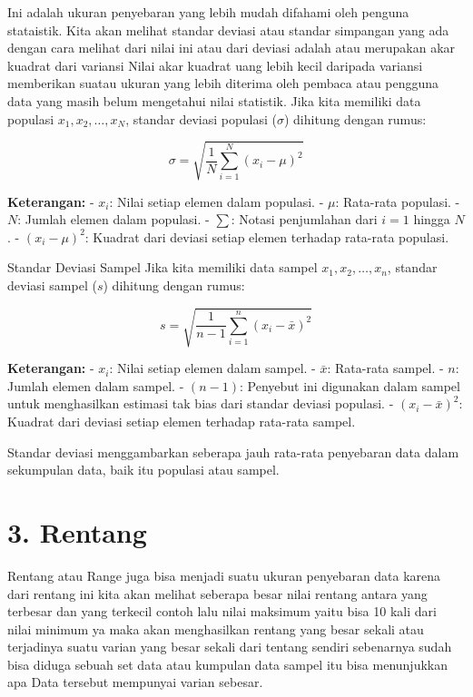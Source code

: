 \documentclass[
]{book}
\theoremstyle{definition}
\theoremstyle{definition}
\theoremstyle{definition}
\theoremstyle{definition}
\theoremstyle{remark}
\begin{document}
Ini adalah ukuran penyebaran yang lebih mudah difahami oleh penguna stataistik. Kita akan melihat standar deviasi atau standar simpangan yang ada dengan cara melihat dari nilai ini atau dari deviasi adalah atau merupakan akar kuadrat dari variansi
Nilai akar kuadrat uang lebih kecil daripada variansi memberikan suatau ukuran yang lebih diterima oleh pembaca atau pengguna data yang masih belum mengetahui nilai statistik.
Jika kita memiliki data populasi \(x_1, x_2, \dots, x_N\), standar deviasi populasi (\(\sigma\)) dihitung dengan rumus:

\[
\sigma = \sqrt{\frac{1}{N} \sum_{i=1}^{N} (x_i - \mu)^2}
\]

\textbf{Keterangan:}
- \(x_i\): Nilai setiap elemen dalam populasi.
- \(\mu\): Rata-rata populasi.
- \(N\): Jumlah elemen dalam populasi.
- \(\sum\): Notasi penjumlahan dari \(i = 1\) hingga \(N\).
- \((x_i - \mu)^2\): Kuadrat dari deviasi setiap elemen terhadap rata-rata populasi.

Standar Deviasi Sampel
Jika kita memiliki data sampel \(x_1, x_2, \dots, x_n\), standar deviasi sampel (\(s\)) dihitung dengan rumus:

\[
s = \sqrt{\frac{1}{n - 1} \sum_{i=1}^{n} (x_i - \bar{x})^2}
\]

\textbf{Keterangan:}
- \(x_i\): Nilai setiap elemen dalam sampel.
- \(\bar{x}\): Rata-rata sampel.
- \(n\): Jumlah elemen dalam sampel.
- \((n - 1)\): Penyebut ini digunakan dalam sampel untuk menghasilkan estimasi tak bias dari standar deviasi populasi.
- \((x_i - \bar{x})^2\): Kuadrat dari deviasi setiap elemen terhadap rata-rata sampel.

Standar deviasi menggambarkan seberapa jauh rata-rata penyebaran data dalam sekumpulan data, baik itu populasi atau sampel.

\hypertarget{rentang}{%
\section*{3. Rentang}\label{rentang}}

Rentang atau Range juga bisa menjadi suatu ukuran penyebaran data karena dari rentang ini kita akan melihat seberapa besar nilai rentang antara yang terbesar dan yang terkecil contoh lalu nilai maksimum yaitu bisa 10 kali dari nilai minimum ya maka akan menghasilkan rentang yang besar sekali atau terjadinya suatu varian yang besar sekali dari tentang sendiri sebenarnya sudah bisa diduga sebuah set data atau kumpulan data sampel itu bisa menunjukkan apa Data tersebut mempunyai varian sebesar.
\end{document}

